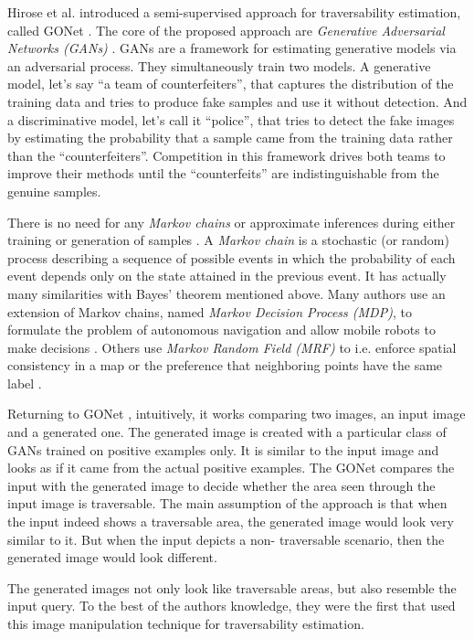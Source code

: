 \documentclass[12pt,a4paper]{report}
\newcommand{\etal}[1]{#1 et al.}
\newcommand{\alleg}{\enquote}
\newcommand{\term}{\textit}
\newcommand{\acronym}{\MakeUppercase}
\begin{document}
	\etal{Hirose} introduced a semi-supervised approach for traversability 
	estimation, called GONet \cite{HiroseGonet}. The core of the proposed approach 
	are \term{Generative Adversarial Networks (\acronym{gan}s)} \cite{Goodfellow}. \acronym{gan}s are a 
	framework for estimating generative models via an adversarial process. They 
	simultaneously train two models. A generative model, let's say \alleg{a team of 
	counterfeiters}, that captures the distribution of the training data and tries 
	to produce fake samples and use it without detection. And a discriminative model, 
	let's call it \alleg{police}, that tries to detect the fake images by estimating 
	the probability that a sample came from the training data rather than the 
	\alleg{counterfeiters}. Competition in this framework drives both teams to 
	improve their methods until the \alleg{counterfeits} are indistinguishable from 
	the genuine samples.
	\par
	There is no need for any \term{Markov chains} or approximate inferences during either 
	training or generation of samples \cite{Goodfellow}. A \term{Markov chain} is a 
	stochastic (or random) process describing a sequence of possible events in which 
	the probability of each event depends only on the state attained in the previous 
	event. It has actually many similarities with Bayes' theorem mentioned above. 
	Many authors use an extension of Markov chains, named \term{Markov Decision Process 
	(\acronym{mdp})}, to formulate the problem of autonomous navigation and allow 
	mobile robots to make decisions \cite{Wigness, Zhelo}. Others use \term{Markov Random 
	Field (\acronym{mrf})} \cite{Li} to i.e. enforce spatial consistency in a map or the 
	preference that neighboring points have the same label \cite{Lalonde}.
	\par
	Returning to GONet \cite{HiroseGonet}, intuitively, it works comparing two images, 
	an input image and a generated one. The generated image is created with a 
	particular class of \acronym{gan}s trained on positive examples only. It is 
	similar to the input image and looks as if it came from the actual positive 
	examples. The GONet compares the input with the generated image to decide whether 
	the area seen through the input image is traversable. The main assumption of 
	the approach is that when the input indeed shows a traversable area, the 
	generated image would look very similar to it. But when the input depicts a non-
	traversable scenario, then the generated image would look different.
	\par
	The generated images not only look like	traversable areas, but also resemble the 
	input query. To the best of the authors knowledge, they were the first that used 
	this image manipulation technique for traversability estimation.
	\\\\
	
\end{document}
